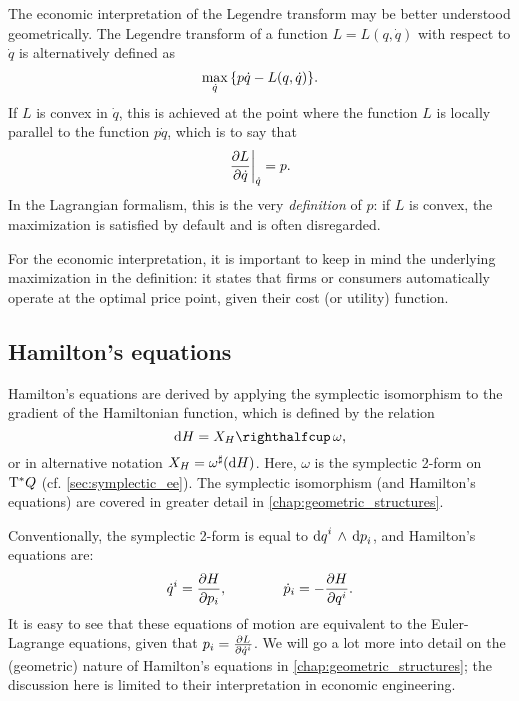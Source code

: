 The economic interpretation of the Legendre transform may be better understood geometrically. The Legendre transform of a function $L = L(q, \dot{q})$ with respect to $\dot{q}$ is alternatively defined as
\begin{equation}
    \max_{\dot{q}}\qty{p\dot{q} - L(q, \dot{q})}.
\end{equation}
If $L$ is convex in $\dot{q}$, this is achieved at the point where the function $L$ is locally parallel to the function $p\dot{q}$, which is to say that
\begin{equation}
    \left.\pdv{L}{\dot{q}}\right |_{\dot{q}} = p.
\end{equation}
In the Lagrangian formalism, this is the very \emph{definition} of $p$: if $L$ is convex, the maximization is satisfied by default and is often disregarded.

For the economic interpretation, it is important to keep in mind the underlying maximization in the definition: it states that firms or consumers automatically operate at the optimal price point, given their cost (or utility) function.

\subsection{Hamilton's equations} 
Hamilton's equations are derived by applying the symplectic isomorphism to the gradient of the Hamiltonian function, which is defined by the relation
\begin{equation}
    \dd{H} = \intpr{X_H}{\omega},
\end{equation}
or in alternative notation \(X_H = \omega^\sharp(\dd{H})\). Here, $\omega$ is the symplectic 2-form on $\mathrm{T}^*Q$ (cf. \cref{sec:symplectic_ee}). The symplectic isomorphism (and Hamilton's equations) are covered in greater detail in \cref{chap:geometric_structures}.

Conventionally, the symplectic 2-form is equal to $ \dd{q}^i\,\wedge\,\dd{p}_i $, and Hamilton's equations are:
\begin{equation}
    \dot{q}^i = \pdv{H}{p_i}, \qquad \qquad \dot{p}_i = -\pdv{H}{q^i}.
    \label{eq:legendre_trans_alternative}
\end{equation}
It is easy to see that these equations of motion are equivalent to the Euler-Lagrange equations, given that \(p_i = \pdv{L}{\dot{q}^i}\). We will go a lot more into detail on the (geometric) nature of Hamilton's equations in \cref{chap:geometric_structures}; the discussion here is limited to their interpretation in economic engineering.

